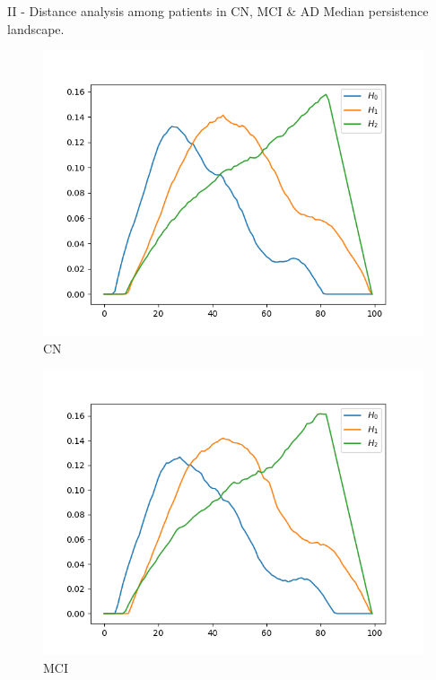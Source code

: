 \documentclass[aspectratio=169, 10pt, dvipsnames]{beamer}
\begin{document}
\begin{frame}[fragile]{II - Distance analysis among patients in CN, MCI \& AD}
  Median persistence landscape.\\
  \begin{figure}
    \centering
    \includegraphics[width=\textwidth]{figures/median_pls/median_pl_CN.png}
    \caption{CN}
  \end{figure}
  \endminipage
  \hfill
  \begin{figure}
    \centering
    \includegraphics[width=\textwidth]{figures/median_pls/median_pl_MCI.png}
    \caption{MCI}
  \end{figure}%
  \endminipage
  \hfill

\end{frame}
\end{document}
